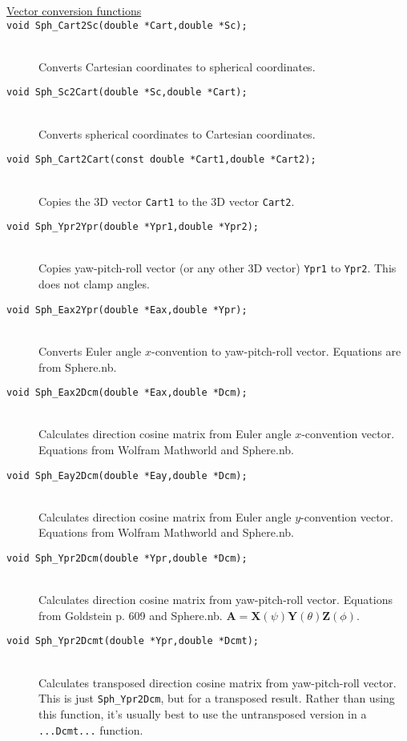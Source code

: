 \documentclass[11pt]{article}
\newcommand {\ttt} {\texttt}
\begin{document}
\begin{description}

\item[\underline{Vector conversion functions}]


\item[\ttt{void Sph\_Cart2Sc(double *Cart,double *Sc);}]
\hfill \\
Converts Cartesian coordinates to spherical coordinates.


\item[\ttt{void Sph\_Sc2Cart(double *Sc,double *Cart);}]
\hfill \\
Converts spherical coordinates to Cartesian coordinates.


\item[\ttt{void Sph\_Cart2Cart(const double *Cart1,double *Cart2);}]
\hfill \\
Copies the 3D vector \ttt{Cart1} to the 3D vector \ttt{Cart2}.


\item[\ttt{void Sph\_Ypr2Ypr(double *Ypr1,double *Ypr2);}]
\hfill \\
Copies yaw-pitch-roll vector (or any other 3D vector) \ttt{Ypr1} to \ttt{Ypr2}. This does not clamp angles.


\item[\ttt{void Sph\_Eax2Ypr(double *Eax,double *Ypr);}]
\hfill \\
Converts Euler angle $x$-convention to yaw-pitch-roll vector. Equations are from Sphere.nb. 


\item[\ttt{void Sph\_Eax2Dcm(double *Eax,double *Dcm);}]
\hfill \\
Calculates direction cosine matrix from Euler angle $x$-convention vector. Equations from Wolfram Mathworld and Sphere.nb.


\item[\ttt{void Sph\_Eay2Dcm(double *Eay,double *Dcm);}]
\hfill \\
Calculates direction cosine matrix from Euler angle $y$-convention vector. Equations from Wolfram Mathworld and Sphere.nb.


\item[\ttt{void Sph\_Ypr2Dcm(double *Ypr,double *Dcm);}]
\hfill \\
Calculates direction cosine matrix from yaw-pitch-roll vector. Equations from Goldstein p. 609 and Sphere.nb. $\bm{A} = \bm{X}(\psi)\bm{Y}(\theta)\bm{Z}(\phi)$.


\item[\ttt{void Sph\_Ypr2Dcmt(double *Ypr,double *Dcmt);}]
\hfill \\
Calculates transposed direction cosine matrix from yaw-pitch-roll vector. This is just \ttt{Sph\_Ypr2Dcm}, but for a transposed result. Rather than using this function, it's usually best to use the untransposed version in a \ttt{...Dcmt...} function.



\end{description}
\end{document}
